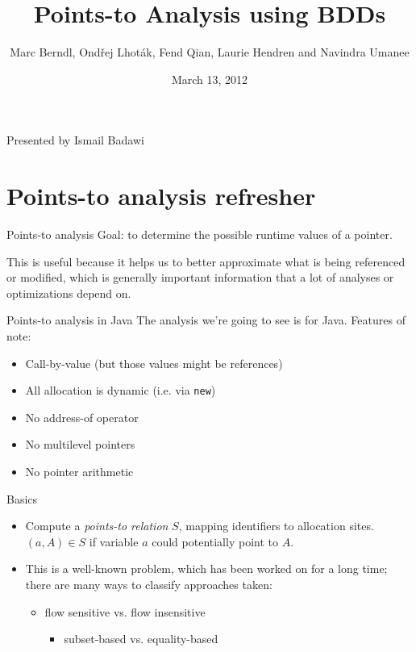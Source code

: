 \documentclass{beamer}
\title[Points-to Analysis using BDDs]{Points-to Analysis using BDDs}
\date{March 13, 2012}
\author[Marc Berndl et al.]{Marc Berndl, Ond\v{r}ej Lhot\'{a}k, Fend Qian, Laurie Hendren and Navindra Umanee \nocite{Berndl::PointsToBDDs}}
\begin{document}

\begin{frame}
\titlepage
\begin{center}
Presented by Ismail Badawi
\end{center}
\end{frame}

\begin{frame}
\tableofcontents
\end{frame}

\section{Points-to analysis refresher}
\begin{frame}{Points-to analysis}
Goal: to determine the possible runtime values of a pointer. 

This is useful because it helps us to better approximate what is being
referenced or modified, which is generally important information that a
lot of analyses or optimizations depend on.
\end{frame}

\begin{frame}{Points-to analysis in Java} 
The analysis we're going to see is for Java. Features of note:
    \begin{itemize}
        \item Call-by-value (but those values might be references) 
        \item All allocation is dynamic (i.e. via {\tt new}) 
        \item No address-of operator 
        \item No multilevel pointers 
        \item No pointer arithmetic
    \end{itemize}
\end{frame}

\begin{frame}{Basics}
\nocite{Hind::PointerAnalysis}
\begin{itemize}
\item Compute a \emph{points-to relation} $S$, mapping identifiers to
      allocation sites. $(a, A) \in S$ if variable $a$ could potentially
      point to $A$.
\item This is a well-known problem, which has been worked on for a long
time; there are many ways to classify approaches taken:
    \begin{itemize}
      \item flow sensitive vs.  flow insensitive
        \begin{itemize}
        \item subset-based vs. equality-based
        \end{itemize}
    \end{itemize}
\end{itemize}
\end{frame}
\end{document}
